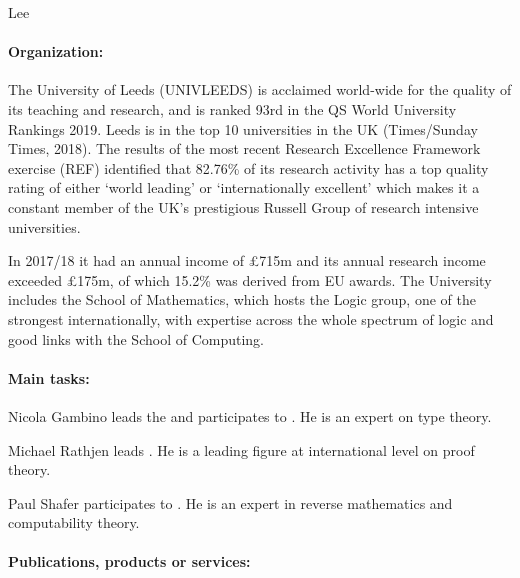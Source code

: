 \begin{sitedescription}{Lee}


\paragraph*{Organization:} The University of Leeds (UNIVLEEDS) is acclaimed world-wide for the quality of its teaching and research, and is ranked 93rd in the QS World University Rankings 2019. Leeds is in the top 10 universities in the UK (Times/Sunday Times, 2018). The results of the most recent Research Excellence Framework exercise (REF) identified that 82.76\% 
of its research activity has a top quality rating of either `world leading' or `internationally excellent' which makes it a constant member of the UK's prestigious Russell Group of research intensive universities. 

In 2017/18 it had an annual income of \pounds 715m and its annual research income exceeded \pounds 175m, of which 15.2\% was derived from EU awards. The University includes the School of Mathematics,
which hosts the Logic group, one of the strongest internationally, with expertise across the whole
spectrum of logic and good links with the School of Computing.




\paragraph*{Main tasks:}

\begin{compactitem}
\item Nicola Gambino leads  the  and participates to . He is an expert on type theory. 
\item Michael Rathjen leads . He is a leading figure at international level
on proof theory. 
\item Paul Shafer participates to  . He is an expert in reverse mathematics
and computability theory.
\end{compactitem}


\paragraph*{Publications, products or services:} 


\end{sitedescription}
